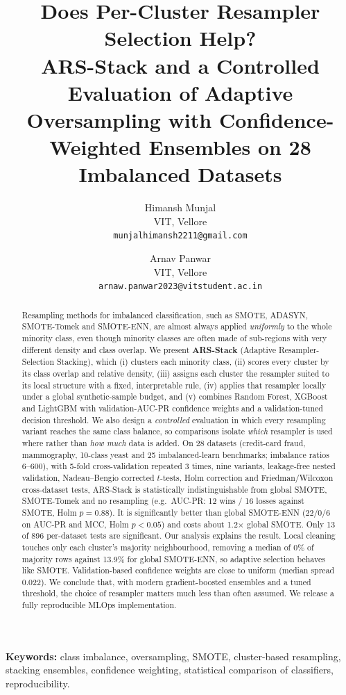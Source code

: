\documentclass[11pt,a4paper]{article}
\title{\textbf{Does Per-Cluster Resampler Selection Help?\\ ARS-Stack and a Controlled Evaluation of Adaptive Oversampling with Confidence-Weighted Ensembles on 28 Imbalanced Datasets}}
\author{Himansh Munjal\\ VIT, Vellore\\ \texttt{munjalhimansh2211@gmail.com}
\and Arnav Panwar\\ VIT, Vellore\\ \texttt{arnaw.panwar2023@vitstudent.ac.in}}
\date{}
\begin{document}
\maketitle

\begin{abstract}
Resampling methods for imbalanced classification, such as SMOTE, ADASYN, SMOTE-Tomek and SMOTE-ENN, are almost always applied \emph{uniformly} to the whole minority class, even though minority classes are often made of sub-regions with very different density and class overlap. We present \textbf{ARS-Stack} (Adaptive Resampler-Selection Stacking), which (i) clusters each minority class, (ii) scores every cluster by its class overlap and relative density, (iii) assigns each cluster the resampler suited to its local structure with a fixed, interpretable rule, (iv) applies that resampler locally under a global synthetic-sample budget, and (v) combines Random Forest, XGBoost and LightGBM with validation-AUC-PR confidence weights and a validation-tuned decision threshold. We also design a \emph{controlled} evaluation in which every resampling variant reaches the same class balance, so comparisons isolate \emph{which} resampler is used where rather than \emph{how much} data is added. On 28 datasets (credit-card fraud, mammography, 10-class yeast and 25 imbalanced-learn benchmarks; imbalance ratios 6--600), with 5-fold cross-validation repeated 3 times, nine variants, leakage-free nested validation, Nadeau--Bengio corrected $t$-tests, Holm correction and Friedman/Wilcoxon cross-dataset tests, ARS-Stack is statistically indistinguishable from global SMOTE, SMOTE-Tomek and no resampling (e.g.\ AUC-PR: 12 wins / 16 losses against SMOTE, Holm $p=0.88$). It is significantly better than global SMOTE-ENN (22/0/6 on AUC-PR and MCC, Holm $p<0.05$) and costs about 1.2$\times$ global SMOTE. Only 13 of 896 per-dataset tests are significant. Our analysis explains the result. Local cleaning touches only each cluster's majority neighbourhood, removing a median of 0\% of majority rows against 13.9\% for global SMOTE-ENN, so adaptive selection behaves like SMOTE. Validation-based confidence weights are close to uniform (median spread 0.022). We conclude that, with modern gradient-boosted ensembles and a tuned threshold, the choice of resampler matters much less than often assumed. We release a fully reproducible MLOps implementation.
\end{abstract}

\noindent\textbf{Keywords:} class imbalance, oversampling, SMOTE, cluster-based resampling, stacking ensembles, confidence weighting, statistical comparison of classifiers, reproducibility.
\end{document}

